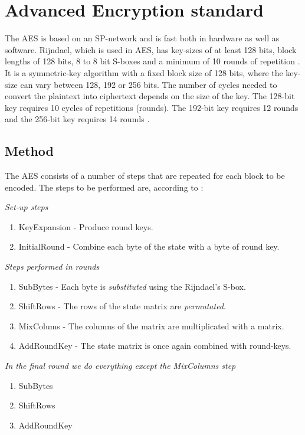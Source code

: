 \chapter{Advanced Encryption standard}\label{ch:AES}
The AES is based on an SP-network and is fast both in hardware as well as 
software. Rijndael, which is used in AES, has key-sizes of at least 128 bits, 
block lengths of 128 bits, 8 to 8 bit S-boxes and a minimum of 10 rounds of 
repetition \citep[p. 79]{Stinson:2006}. It is a symmetric-key algorithm with a 
fixed block size of 128 bits, where the key-size can vary between 128, 192 or 
256 bits. The number of cycles needed to convert the plaintext into ciphertext 
depends on the size of the key. The 128-bit key requires 10 cycles of 
repetitions (rounds). The 192-bit key requires 12 rounds and the 256-bit key 
requires 14 rounds \citep[p. 103]{Stinson:2006}.

\section{Method}
The AES consists of a number of steps that are repeated for each block to be 
encoded. The steps to be performed are, according to \citet{Stinson:2006}:

\emph{Set-up steps}
\begin{enumerate}
\item KeyExpansion - Produce round keys.
\item InitialRound - Combine each byte of the state with a byte of round key.
\end{enumerate}
\emph{Steps performed in rounds}
\begin{enumerate}
\item SubBytes - Each byte is \emph{substituted} using the Rijndael's S-box.
\item ShiftRows - The rows of the state matrix are \emph{permutated}.
\item MixColums - The columns of the matrix are multiplicated with a matrix.
\item AddRoundKey - The state matrix is once again combined with round-keys.
\end{enumerate}
\emph{In the final round we do everything except the MixColumns step}
\begin{enumerate}
\item SubBytes
\item ShiftRows
\item AddRoundKey
\end{enumerate}

